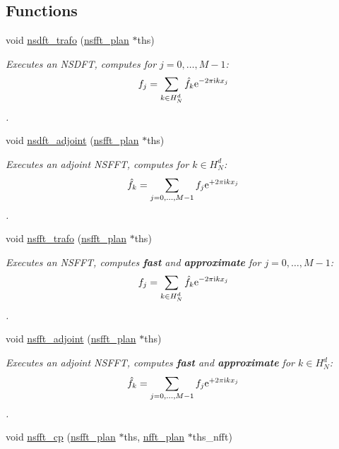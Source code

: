 \subsection*{Functions}
\begin{CompactItemize}
\item 
void \hyperlink{group__nsfft_gd7ab4bcc35ad74e32af2abe42bc9e7f3}{nsdft\_\-trafo} (\hyperlink{structnsfft__plan}{nsfft\_\-plan} $\ast$ths)
\begin{CompactList}\small\item\em Executes an NSDFT, computes for $j=0,\hdots,M-1$: \[ f_j = \sum_{k\in H_N^d}\hat f_k {\rm e}^{-2\pi{\rm\scriptsize i}k x_j} \]. \item\end{CompactList}\item 
void \hyperlink{group__nsfft_ge287757bca5164f2e5db7fe92ae1df13}{nsdft\_\-adjoint} (\hyperlink{structnsfft__plan}{nsfft\_\-plan} $\ast$ths)
\begin{CompactList}\small\item\em Executes an adjoint NSFFT, computes for $k\in H_N^d$: \[ \hat f_k = \sum_{j=0,\hdots,M-1} f_j {\rm e}^{+2\pi{\rm\scriptsize i}k x_j} \]. \item\end{CompactList}\item 
void \hyperlink{group__nsfft_gee06e4a864e22e2c41f71606a8e2644e}{nsfft\_\-trafo} (\hyperlink{structnsfft__plan}{nsfft\_\-plan} $\ast$ths)
\begin{CompactList}\small\item\em Executes an NSFFT, computes {\bf fast} and {\bf approximate} for $j=0,\hdots,M-1$: \[ f_j = \sum_{k\in H_N^d}\hat f_k {\rm e}^{-2\pi{\rm\scriptsize i}k x_j} \]. \item\end{CompactList}\item 
void \hyperlink{group__nsfft_gb3de4bceeffaea05a29daf75cad04d38}{nsfft\_\-adjoint} (\hyperlink{structnsfft__plan}{nsfft\_\-plan} $\ast$ths)
\begin{CompactList}\small\item\em Executes an adjoint NSFFT, computes {\bf fast} and {\bf approximate} for $k\in H_N^d$: \[ \hat f_k = \sum_{j=0,\hdots,M-1} f_j {\rm e}^{+2\pi{\rm\scriptsize i}k x_j} \]. \item\end{CompactList}\item 
void \hyperlink{group__nsfft_ga90a04e2110e52bedb70382704f3f004}{nsfft\_\-cp} (\hyperlink{structnsfft__plan}{nsfft\_\-plan} $\ast$ths, \hyperlink{structnfft__plan}{nfft\_\-plan} $\ast$ths\_\-nfft)

\end{CompactItemize}

